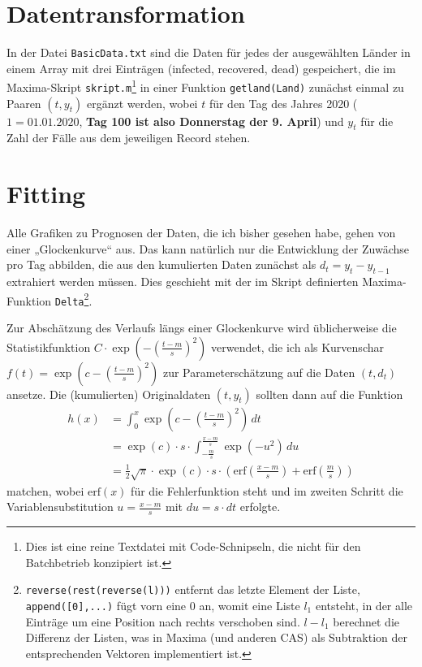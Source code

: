 \documentclass[a4paper,11pt]{article}
\newcommand{\br}[1]{\left(#1\right)}
\newcommand{\erf}{\mathrm{erf}}
\newcommand{\m}{\cdot}
\begin{document}
\section{Datentransformation}

In der Datei \texttt{BasicData.txt} sind die Daten für jedes der ausgewählten
Länder in einem Array mit drei Einträgen (infected, recovered, dead)
gespeichert, die im Maxima-Skript \texttt{skript.m}\footnote{Dies ist eine
  reine Textdatei mit Code-Schnipseln, die nicht für den Batchbetrieb
  konzipiert ist.} in einer Funktion \texttt{getland(Land)} zunächst einmal zu
Paaren $(t,y_t)$ ergänzt werden, wobei $t$ für den Tag des Jahres 2020
($1=01.01.2020$, \textbf{Tag 100 ist also Donnerstag der 9. April}) und $y_t$
für die Zahl der Fälle aus dem jeweiligen Record stehen.

\section{Fitting}

Alle Grafiken zu Prognosen der Daten, die ich bisher gesehen habe, gehen von
einer „Glockenkurve“ aus.  Das kann natürlich nur die Entwicklung der Zuwächse
pro Tag abbilden, die aus den kumulierten Daten zunächst als $d_t=y_t-y_{t-1}$
extrahiert werden müssen. Dies geschieht mit der im Skript definierten
Maxima-Funktion \texttt{Delta}\footnote{\texttt{reverse(rest(reverse(l)))}
  entfernt das letzte Element der Liste, \texttt{append([0],...)} fügt vorn
  eine $0$ an, womit eine Liste $l_1$ entsteht, in der alle Einträge um eine
  Position nach rechts verschoben sind. $l-l_1$ berechnet die Differenz der
  Listen, was in Maxima (und anderen CAS) als Subtraktion der entsprechenden
  Vektoren implementiert ist.}.

Zur Abschätzung des Verlaufs längs einer Glockenkurve wird üblicherweise die
Statistikfunktion $C\m\exp\br{-\br{\frac{t-m}{s}}^2}$ verwendet, die ich als
Kurvenschar $f(t)=\exp\br{c-\br{\frac{t-m}{s}}^2}$ zur Parameterschätzung auf
die Daten $(t,d_t)$ ansetze.  Die (kumulierten) Originaldaten $(t,y_t)$
sollten dann auf die Funktion
\begin{align*}
  h(x)&=\int_0^x{\exp\br{c-\br{\frac{t-m}{s}}^2}}\,dt\\ &=\exp(c)\m s\m
  \int_{-\frac{m}{s}}^{\frac{x-m}{s}}{\exp\br{-u^2}}\,du\\ &=\frac12 \sqrt{\pi}\m
  \exp(c)\m s\m \br{\erf\br{\frac{x-m}{s}}+ \erf\br{\frac{m}{s}}}
\end{align*}
matchen, wobei $\erf(x)$ für die Fehlerfunktion steht und im zweiten Schritt
die Variablensubstitution $u=\frac{x-m}{s}$ mit $du=s\m dt$ erfolgte.
\end{document}
